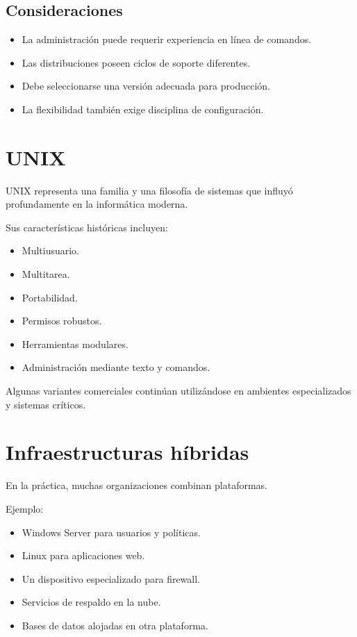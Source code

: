 \documentclass[
  spanish,
  letterpaper,
]{scrbook}
\providecommand{\tightlist}{%
  \setlength{\itemsep}{0pt}\setlength{\parskip}{0pt}}
\begin{document}
\section{Consideraciones}\label{consideraciones-1}

\begin{itemize}
\tightlist
\item
  La administración puede requerir experiencia en línea de comandos.
\item
  Las distribuciones poseen ciclos de soporte diferentes.
\item
  Debe seleccionarse una versión adecuada para producción.
\item
  La flexibilidad también exige disciplina de configuración.
\end{itemize}


\chapter{UNIX}\label{unix}

UNIX representa una familia y una filosofía de sistemas que influyó
profundamente en la informática moderna.

Sus características históricas incluyen:

\begin{itemize}
\tightlist
\item
  Multiusuario.
\item
  Multitarea.
\item
  Portabilidad.
\item
  Permisos robustos.
\item
  Herramientas modulares.
\item
  Administración mediante texto y comandos.
\end{itemize}

Algunas variantes comerciales continúan utilizándose en ambientes
especializados y sistemas críticos.


\chapter{Infraestructuras híbridas}\label{infraestructuras-huxedbridas}

En la práctica, muchas organizaciones combinan plataformas.

Ejemplo:

\begin{itemize}
\tightlist
\item
  Windows Server para usuarios y políticas.
\item
  Linux para aplicaciones web.
\item
  Un dispositivo especializado para firewall.
\item
  Servicios de respaldo en la nube.
\item
  Bases de datos alojadas en otra plataforma.
\end{itemize}
\end{document}
